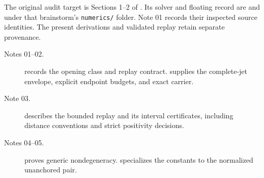 \documentclass[11pt]{article}
\theoremstyle{remark}\newtheorem{remark}[theorem]{Remark}
\begin{document}
The original audit target is Sections 1--2 of . Its solver and floating record are  and  under that brainstorm's \texttt{numerics/} folder. Note 01 records their inspected source identities. The present derivations and validated replay retain separate provenance.

\begin{description}
\item[Notes 01--02.]  records the opening class and replay contract.  supplies the complete-jet envelope, explicit endpoint budgets, and exact carrier.
\item[Note 03.]  describes the bounded replay and its interval certificates, including distance conventions and strict positivity decisions.
\item[Notes 04--05.]  proves generic nondegeneracy.  specializes the constants to the normalized unanchored pair.
\end{description}
\end{document}
